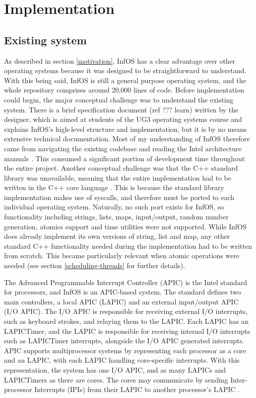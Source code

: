 \documentclass[bsc,frontabs,singlespacing,parskip,deptreport]{infthesis}
\begin{document}
\chapter{Implementation} \label{implementation}

\section{Existing system} \label{existing-system}
As described in section \ref{motivation}, InfOS has a clear advantage over other operating systems because it was designed to be straightforward to understand. With this being said, InfOS is still a general purpose operating system, and the whole repository comprises around 20,000 lines of code. Before implementation could begin, the major conceptual challenge was to understand the existing system. There is a brief specification document (ref ??? learn) written by the designer, which is aimed at students of the UG3 operating systems course and explains InfOS’s high-level structure and implementation, but it is by no means extensive technical documentation. Most of my understanding of InfOS therefore came from navigating the existing codebase and reading the Intel architecture manuals \cite{intel-full-manual}. This consumed a significant portion of development time throughout the entire project. Another conceptual challenge was that the C++ standard library was unavailable, meaning that the entire implementation had to be written in the C++ core language \cite{cpp-core}. This is because the standard library implementation makes use of syscalls, and therefore must be ported to each individual operating system. Naturally, no such port exists for InfOS, so functionality including strings, lists, maps, input/output, random number generation, atomics support and time utilities were not supported. While InfOS does already implement its own versions of string, list and map, any other standard C++ functionality needed during the implementation had to be written from scratch. This became particularly relevant when atomic operations were needed (see section \ref{scheduling-threads} for further details).
 
The Advanced Programmable Interrupt Controller (APIC) \cite{intel-sys-prog-guide} is the Intel standard for processors, and InfOS is an APIC-based system. The standard defines two main controllers, a local APIC (LAPIC) and an external input/output APIC (I/O APIC). The I/O APIC is responsible for receiving external I/O interrupts, such as keyboard strokes, and relaying them to the LAPIC. Each LAPIC has an LAPICTimer, and the LAPIC is responsible for receiving internal I/O interrupts such as LAPICTimer interrupts, alongside the I/O APIC generated interrupts. APIC supports multiprocessor systems by representing each processor as a core and an LAPIC, with each LAPIC handling core-specific interrupts. With this representation, the system has one I/O APIC, and as many LAPICs and LAPICTimers as there are cores. The cores may communicate by sending Inter-processor Interrupts (IPIs) from their LAPIC to another processor’s LAPIC \cite{intel-sys-prog-guide}. 
\end{document}

